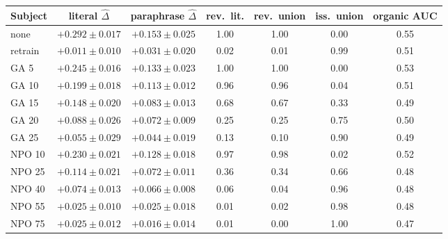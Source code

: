 \begin{tabular}{lcccccc}
\toprule
Subject & literal $\hat\Delta$ & paraphrase $\hat\Delta$ & rev.\ lit. & rev.\ union & iss.\ union & organic AUC \\
\midrule
none & $+0.292\pm0.017$ & $+0.153\pm0.025$ & 1.00 & 1.00 & 0.00 & 0.55 \\
retrain & $+0.011\pm0.010$ & $+0.031\pm0.020$ & 0.02 & 0.01 & 0.99 & 0.51 \\
\midrule
GA 5 & $+0.245\pm0.016$ & $+0.133\pm0.023$ & 1.00 & 1.00 & 0.00 & 0.53 \\
GA 10 & $+0.199\pm0.018$ & $+0.113\pm0.012$ & 0.96 & 0.96 & 0.04 & 0.51 \\
GA 15 & $+0.148\pm0.020$ & $+0.083\pm0.013$ & 0.68 & 0.67 & 0.33 & 0.49 \\
GA 20 & $+0.088\pm0.026$ & $+0.072\pm0.009$ & 0.25 & 0.25 & 0.75 & 0.50 \\
GA 25 & $+0.055\pm0.029$ & $+0.044\pm0.019$ & 0.13 & 0.10 & 0.90 & 0.49 \\
NPO 10 & $+0.230\pm0.021$ & $+0.128\pm0.018$ & 0.97 & 0.98 & 0.02 & 0.52 \\
NPO 25 & $+0.114\pm0.021$ & $+0.072\pm0.011$ & 0.36 & 0.34 & 0.66 & 0.48 \\
NPO 40 & $+0.074\pm0.013$ & $+0.066\pm0.008$ & 0.06 & 0.04 & 0.96 & 0.48 \\
NPO 55 & $+0.025\pm0.010$ & $+0.025\pm0.018$ & 0.01 & 0.02 & 0.98 & 0.48 \\
NPO 75 & $+0.025\pm0.012$ & $+0.016\pm0.014$ & 0.01 & 0.00 & 1.00 & 0.47 \\
\bottomrule
\end{tabular}
